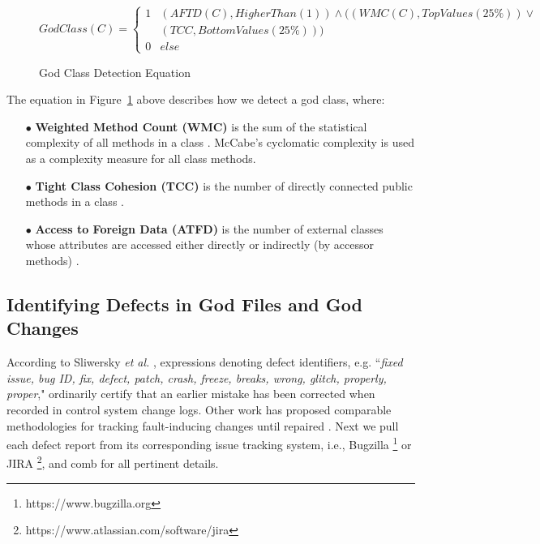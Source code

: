 \begin{figure}[h]
\[GodClass(C) = \left\{\begin{matrix}
1& (AFTD(C), HigherThan(1))  \wedge ((WMC(C), TopValues(25\%)) \vee \\ 
 & (TCC, BottomValues(25\%)))\\ 
0& else
\end{matrix}\right.\]
\captionsetup[figure]{list=no}
\caption{God Class Detection Equation}
\label{equation:1}
\end{figure}

The equation in Figure~\ref{equation:1} above describes how we detect a god class, where:


\begin{itemize}
\item[$\bullet$] \textbf{Weighted Method Count (WMC)} is the sum of the statistical complexity of all methods in a class \cite{Chidamber_Kemerer_94}. McCabe's cyclomatic complexity \cite{McCabe_1976} is used as a complexity measure for all class methods.
\item[$\bullet$] \textbf{Tight Class Cohesion (TCC)} is the number of directly connected public methods in a class \cite{Bieman:1995:CRO:223427.211856}.
\item[$\bullet$] \textbf{Access to Foreign Data (ATFD)} is the number of external classes whose attributes are accessed either directly or indirectly (by accessor methods) \cite{Marinescu_PhD}.
\end{itemize}

\subsection{Identifying Defects in God Files and God Changes}
\label{ch4_bugs_td}

According to Sliwersky \textit{et al.} \cite{sliwerski-msr-2005}, expressions denoting defect identifiers, e.g. ``\textit{fixed issue, bug ID, fix, defect, patch, crash, freeze, breaks, wrong, glitch, properly, proper}," ordinarily certify that an earlier mistake has been corrected when recorded in control system change logs. Other work has proposed comparable methodologies for tracking fault-inducing changes until repaired \cite{Kamei-tse-2013, Kim-tse-2008, sliwerski-msr-2005}. Next we pull each defect report from its corresponding issue tracking system, i.e., Bugzilla \footnote{https://www.bugzilla.org} or JIRA \footnote{https://www.atlassian.com/software/jira}, and comb for all pertinent details.


